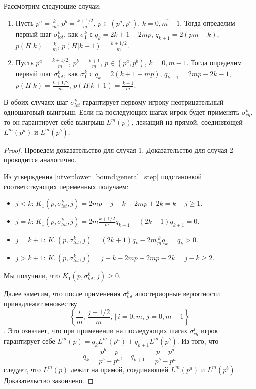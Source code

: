 \begin{utver}
\label{utver:lower_bound:lottery}
Рассмотрим следующие случаи:
\begin{enumerate}
\item
Пусть 
$ p^a = \frac{k}{m} $,
$ p^b = \frac{k+1/2}{m} $,
$ p \in \left(p^a, p^b\right) $, 
$ k = \overline{0, m-1} $. 
Тогда определим первый шаг $ \sigma^{k}_{lot} $, как $ \sigma^k_1 $ с 
$ q_k = 2k + 1 - 2mp $, 
$ q_{k+1} = 2(pm - k) $, 
$ p(H|k) = \frac{k}{m} $,
$ p(H|k+1) = \frac{k+1/2}{m} $.

\item
Пусть 
$ p^a = \frac{k+1/2}{m} $,
$ p^b = \frac{k+1}{m} $,
$ p \in \left(p^a, p^b\right) $, 
$ k = \overline{0, m-1} $. 
Тогда определим первый шаг $ \sigma^{k}_{lot} $, как $ \sigma^k_1 $ с 
$ q_k = 2(k + 1 - mp) $, 
$ q_{k+1} = 2mp - 2k - 1 $, 
$ p(H|k) = \frac{k+1/2}{m} $,
$ p(H|k+1) = \frac{k+1}{m} $.
\end{enumerate}

В обоих случаях шаг $ \sigma^k_{lot} $ гарантирует первому игроку неотрицательный одношаговый выигрыш. Если на последующих шагах игрок будет применять $ \sigma^k_{eq} $, то он гарантирует себе выигрыш $ L^m(p) $, лежащий на прямой, соединяющей $ L^m(p^a) $ и $ L^m(p^b) $.
\end{utver}
\begin{proof}
Проведем доказательство для случая 1. Доказательство для случая 2 проводится аналогично.

Из утверждения \ref{utver:lower_bound:general_step} подстановкой соответствующих переменных получаем:
\begin{itemize}
\item
    $ j < k $: 
        $ K_1(p, \sigma^k_{lot}, j) = 2mp - j - k - 2mp + 2k = k - j \geq 1 $.
\item
    $ j = k $:
        $ K_1(p, \sigma^k_{lot}, j) = 2m\frac{k+1/2}{m}q_{k+1} - (2k+1)q_{k+1} = 0 $.
\item
    $ j = k + 1 $:
        $ K_1(p, \sigma^k_{lot}, j) = (2k + 1)q_k - 2m\frac{k}{m}q_k = q_k > 0 $.
\item
    $ j > k + 1 $:
        $ K_1(p, \sigma^k_{lot}, j) = j + k - 2mp + 2mp - 2k = j - k \geq 2 $.
\end{itemize}

Мы получили, что $ K_1(p, \sigma^k_{lot}, j) \geq 0 $. 

Далее заметим, что после применения $ \sigma^k_{lot} $ апостериорные вероятности принадлежат множеству
\[
    \left\{
        \frac{i}{m}, \, \frac{j+1/2}{m}, \,|\, i = \overline{0, m}, \, j = \overline{0, m-1}
    \right\}
\].
Это означает, что при применении на последующих шагах $ \sigma^i_{eq} $ игрок гарантирует себе 
$ L^m(p) = q_k L^m(p^a) + q_{k+1} L^m(p^b) $. Из того, что 
\[
    q_k = \frac{p^b - p}{p^b - p^a}, \quad q_{k+1} = \frac{p - p^a}{p^b - p^a} 
\]
следует, что $ L^m(p) $ лежит на прямой, соединяющей $ L^m(p^a) $ и $ L^m(p^b) $. Доказательство закончено.
\end{proof}



